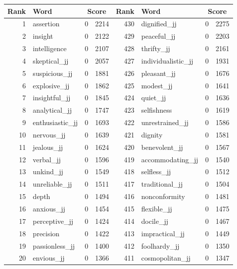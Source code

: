 \begin{table}[tbp]
    \begin{tabular}{| rlr@{.}l | rlr@{.}l |}
    \hline
    \textbf{Rank} & \textbf{Word} & \multicolumn{2}{c|}{\textbf{Score}} & \textbf{Rank} & \textbf{Word} & \multicolumn{2}{c|}{\textbf{Score}} \\
    \hline
    1 & assertion & 0 & 2214    &    430 & dignified\_jj & 0 & 2275 \\
    2 & insight & 0 & 2122    &    429 & peaceful\_jj & 0 & 2203 \\
    3 & intelligence & 0 & 2107    &    428 & thrifty\_jj & 0 & 2161 \\
    4 & skeptical\_jj & 0 & 2057    &    427 & individualistic\_jj & 0 & 1931 \\
    5 & suspicious\_jj & 0 & 1881    &    426 & pleasant\_jj & 0 & 1676 \\
    6 & explosive\_jj & 0 & 1862    &    425 & modest\_jj & 0 & 1641 \\
    7 & insightful\_jj & 0 & 1845    &    424 & quiet\_jj & 0 & 1636 \\
    8 & analytical\_jj & 0 & 1747    &    423 & selfishness & 0 & 1619 \\
    9 & enthusiastic\_jj & 0 & 1693    &    422 & unrestrained\_jj & 0 & 1586 \\
    10 & nervous\_jj & 0 & 1639    &    421 & dignity & 0 & 1581 \\
    11 & jealous\_jj & 0 & 1624    &    420 & benevolent\_jj & 0 & 1567 \\
    12 & verbal\_jj & 0 & 1596    &    419 & accommodating\_jj & 0 & 1540 \\
    13 & unkind\_jj & 0 & 1549    &    418 & selfless\_jj & 0 & 1512 \\
    14 & unreliable\_jj & 0 & 1511    &    417 & traditional\_jj & 0 & 1504 \\
    15 & depth & 0 & 1494    &    416 & nonconformity & 0 & 1481 \\
    16 & anxious\_jj & 0 & 1454    &    415 & flexible\_jj & 0 & 1475 \\
    17 & perceptive\_jj & 0 & 1424    &    414 & docile\_jj & 0 & 1467 \\
    18 & precision & 0 & 1422    &    413 & impractical\_jj & 0 & 1449 \\
    19 & passionless\_jj & 0 & 1400    &    412 & foolhardy\_jj & 0 & 1350 \\
    20 & envious\_jj & 0 & 1366    &    411 & cosmopolitan\_jj & 0 & 1347 \\

\end{tabular}
\end{table}

